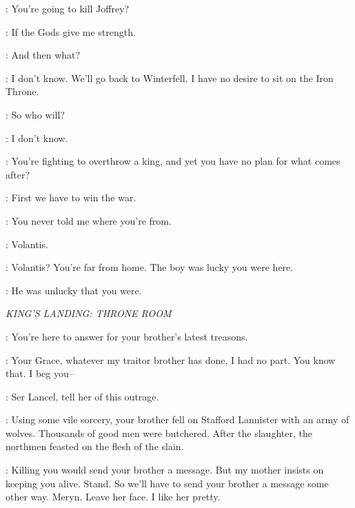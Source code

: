 \TALISA: You're going to kill Joffrey? 

\ROBB: If the Gods give me strength. 

\TALISA: And then what? 

\ROBB: I don't know. We'll go back to Winterfell. I have no desire to sit on the Iron Throne. 

\TALISA: So who will? 

\ROBB: I don't know. 

\TALISA: You're fighting to overthrow a king, and yet you have no plan for what comes after? 

\ROBB: First we have to win the war. 


\ROBB: You never told me where you're from. 

\TALISA: Volantis. 

\ROBB: Volantis? You're far from home. The boy was lucky you were here. 

\TALISA: He was unlucky that you were. 



\scene

\textit{KING'S LANDING: THRONE ROOM} 


\JOFFREY: You're here to answer for your brother's latest treasons. 

\SANSA: Your Grace, whatever my traitor brother has done, I had no part. You know that. I beg you--  

\JOFFREY: Ser Lancel, tell her of this outrage. 


\LANCEL: Using some vile sorcery, your brother fell on Stafford Lannister with an army of wolves. Thousands of good men were butchered. After the slaughter, the northmen feasted on the flesh of the slain. 


\JOFFREY: Killing you would send your brother a message. But my mother insists on keeping you alive. Stand. So we'll have to send your brother a message some other way. Meryn. Leave her face. I like her pretty. 



